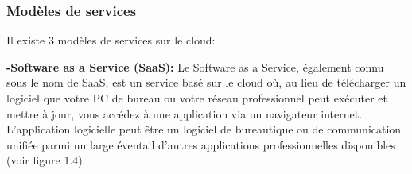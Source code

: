 \subsubsection{\selectfont\Large Modèles de services }

Il existe 3 modèles de services sur le cloud:\\[0.1cm]
\par \noindent \textbf{\Large -Software as a Service (SaaS): }Le Software as a Service, également connu sous le nom de SaaS, est un service basé sur le cloud où, au lieu de télécharger un logiciel que votre PC de bureau ou votre réseau professionnel peut exécuter et mettre à jour, vous accédez à une application via un navigateur internet. L'application logicielle peut être un logiciel de bureautique ou de communication unifiée parmi un large éventail d'autres applications professionnelles disponibles\cite{3} (voir figure 1.4).

